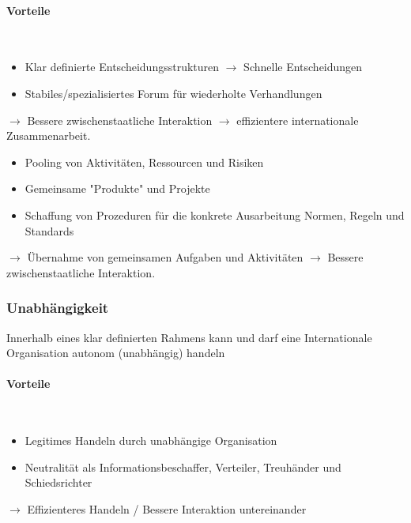 \documentclass[a4paper, 11pt]{article}
\begin{document}
\paragraph{Vorteile} \mbox{}\\

\begin{itemize}	
	\item Klar definierte Entscheidungsstrukturen $\rightarrow$ Schnelle Entscheidungen
	\item Stabiles/spezialisiertes Forum für wiederholte Verhandlungen
\end{itemize}

\textbf{$\rightarrow$}  Bessere zwischenstaatliche Interaktion \textbf{$\rightarrow$}  effizientere internationale Zusammenarbeit.

\begin{itemize}
	\item Pooling von Aktivitäten, Ressourcen und Risiken
	\item Gemeinsame "Produkte" und Projekte
	\item Schaffung von Prozeduren für die konkrete Ausarbeitung Normen, Regeln und Standards
\end{itemize}

$\rightarrow$  Übernahme von gemeinsamen Aufgaben und Aktivitäten $\rightarrow$  Bessere zwischenstaatliche Interaktion.

\subsubsection*{Unabhängigkeit}

Innerhalb eines klar definierten Rahmens kann und darf eine Internationale Organisation autonom (unabhängig) handeln

\paragraph{Vorteile} \mbox{}\\

\begin{itemize}
	\item Legitimes Handeln durch unabhängige Organisation
	\item Neutralität als Informationsbeschaffer, Verteiler, Treuhänder und Schiedsrichter
\end{itemize}

\textbf{$\rightarrow$} Effizienteres Handeln / Bessere Interaktion untereinander
\end{document}
